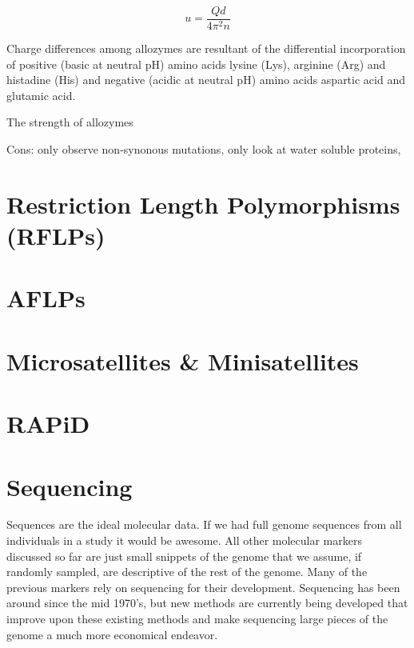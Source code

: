 \documentclass{report}\usepackage[]{graphicx}\usepackage[]{color}
\begin{document}
\begin{equation*}
u=\frac{Qd}{4\pi^2n}
\end{equation*}

Charge differences among allozymes are resultant of the 
differential incorporation of positive (basic at neutral pH) amino acids lysine (Lys), arginine (Arg) and 
histadine (His) and negative (acidic at neutral pH) amino acids aspartic acid and glutamic acid. 

The strength of allozymes 


Cons: only observe non-synonous mutations, only look at water soluble proteins, 

\section{Restriction Length Polymorphisms (RFLPs)}

\section {AFLPs}


\section{Microsatellites \& Minisatellites}

\section{RAPiD}

\section{Sequencing}
Sequences are the ideal molecular data. If we had full genome sequences from all individuals in a study it would
be awesome. All other molecular markers discussed so far are just small snippets of the genome that we assume, if 
randomly sampled, are descriptive of the rest of the genome. Many of the previous 
markers rely on sequencing for their development. Sequencing has been around since the mid 1970's, but new
methods are currently being developed that improve upon these existing methods and make sequencing large
pieces of the genome a much more economical endeavor.
\end{document}

